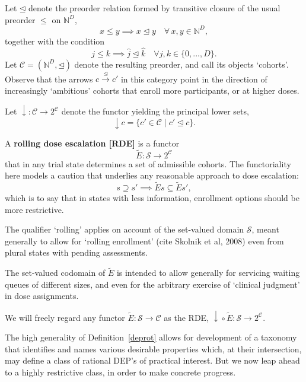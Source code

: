 \documentclass{article}
\newcommand{\N}{\mathbb{N}}
\renewcommand{\S}{\ensuremath{\mathcal{S}}} %
\newcommand{\C}{\ensuremath{\mathcal{C}}}
\begin{document}
\begin{defn}\label{cohcat}
  Let $\unlhd$ denote the preorder relation formed by transitive closure of the usual preorder $\le$ on $\N^D$,
  $$
  x \le y \implies x \unlhd y \quad\forall\, x, y \in \N^D,
  $$
  together with the condition
  $$
  j \le k \implies \widehat{j} \unlhd \widehat{k} \quad\forall j,k \in \{0,...,D\}.
  $$
  Let $\C = (\N^D,\unlhd)$ denote the resulting preorder, and call its objects `cohorts'.  Observe that the arrows $c \xrightarrow{\unlhd} c'$ in this category point in the direction of increasingly `ambitious' cohorts that enroll more participants, or at higher doses.
\end{defn}

\begin{nota}
  Let $\downarrow : \C \rightarrow 2^\C$ denote the functor yielding the principal lower sets,
  $$
  \downarrow c = \{ c' \in \C \mid c' \unlhd c \}.
  $$
\end{nota}

\begin{defn}\label{deprot}
  A \textbf{rolling dose escalation [RDE]} is a functor
  $$
  \widetilde{E} : \S \rightarrow 2^\C
  $$
  that in any trial state determines a set of admissible cohorts.  The functoriality here models a caution that underlies any reasonable approach to dose escalation:
  $$
  s \supseteq s' \implies \widetilde{E} s \subseteq \widetilde{E} s',
  $$
  which is to say that in states with less information, enrollment options should be more restrictive.

  The qualifier `rolling' applies on account of the set-valued domain $\S$, meant generally to allow for `rolling enrollment' (cite Skolnik et al, 2008) even from plural states with pending assessments.
  
  The set-valued codomain of $\widetilde{E}$ is intended to allow generally for servicing waiting queues of different sizes, and even for the arbitrary exercise of `clinical judgment' in dose assignments.

  We will freely regard any functor $\widetilde{E} : \S \rightarrow \C$ as the RDE, $\downarrow\!\circ \widetilde{E} : \S \rightarrow 2^\C$.
\end{defn}

The high generality of Definition~\ref{deprot} allows for development of a taxonomy that identifies and names various desirable properties which, at their intersection, may define a class of rational DEP's of practical interest.  But we now leap ahead to a highly restrictive class, in order to make concrete progress.
\end{document}
